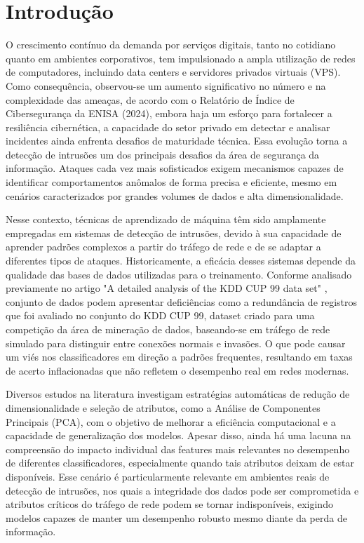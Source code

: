 \section{Introdução}

O crescimento contínuo da demanda por serviços digitais, tanto no cotidiano quanto em ambientes corporativos, tem impulsionado a ampla utilização de redes de computadores, incluindo data centers e servidores privados virtuais (VPS). Como consequência, observou-se um aumento significativo no número e na complexidade das ameaças, de acordo com o Relatório de Índice de Cibersegurança da ENISA (2024)\cite{enisa2025}, embora haja um esforço para fortalecer a resiliência cibernética, a capacidade do setor privado em detectar e analisar incidentes ainda enfrenta desafios de maturidade técnica. Essa evolução torna a detecção de intrusões um dos principais desafios da área de segurança da informação. Ataques cada vez mais sofisticados exigem mecanismos capazes de identificar comportamentos anômalos de forma precisa e eficiente, mesmo em cenários caracterizados por grandes volumes de dados e alta dimensionalidade.

Nesse contexto, técnicas de aprendizado de máquina têm sido amplamente empregadas em sistemas de detecção de intrusões\cite{buczak2015survey}\cite{zamani2013machine}\cite{he2023adversarial}, devido à sua capacidade de aprender padrões complexos a partir do tráfego de rede e de se adaptar a diferentes tipos de ataques. Historicamente, a eficácia desses sistemas depende da qualidade das bases de dados utilizadas para o treinamento. Conforme analisado previamente no artigo "A detailed analysis of the KDD CUP 99 data set" \cite{tavallaee2009detailed}, conjunto de dados podem apresentar deficiências como a redundância de registros que foi avaliado no conjunto do KDD CUP 99, dataset criado para uma competição da área de mineração de dados, baseando-se em tráfego de rede simulado para distinguir entre conexões normais e invasões. O que pode causar um viés nos classificadores em direção a padrões frequentes, resultando em taxas de acerto inflacionadas que não refletem o desempenho real em redes modernas.

Diversos estudos na literatura investigam estratégias automáticas de redução de dimensionalidade e seleção de atributos, como a Análise de Componentes Principais (PCA), com o objetivo de melhorar a eficiência computacional e a capacidade de generalização dos modelos\cite{jia2022feature}\cite{mladenic2005feature}\cite{zaheer2025evaluating}. Apesar disso, ainda há uma lacuna na compreensão do impacto individual das features mais relevantes no desempenho de diferentes classificadores, especialmente quando tais atributos deixam de estar disponíveis. Esse cenário é particularmente relevante em ambientes reais de detecção de intrusões, nos quais a integridade dos dados pode ser comprometida e atributos críticos do tráfego de rede podem se tornar indisponíveis, exigindo modelos capazes de manter um desempenho robusto mesmo diante da perda de informação.

